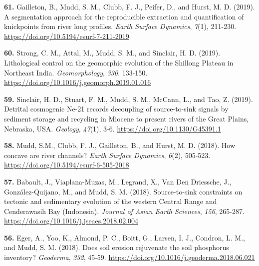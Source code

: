 \documentclass[10pt, a4paper]{article}
\newcommand{\years}[1]{\marginnote{\scriptsize #1}}
\begin{document}
\raggedright
 

\years{2019}\hangindent=0.7cm\textbf{61. }Gailleton, B., Mudd, S. M., Clubb, F. J., Peifer, D., and Hurst, M. D. (2019). A segmentation approach for the reproducible extraction and quantification of knickpoints from river long profiles. \textit{Earth Surface Dynamics}, \textit{7}(1), 211-230. \href{https://doi.org/10.5194/esurf-7-211-2019}{https://doi.org/10.5194/esurf-7-211-2019}\par
\years{2019}\hangindent=0.7cm\textbf{60. }Strong, C. M., Attal, M., Mudd, S. M., and Sinclair, H. D. (2019). Lithological control on the geomorphic evolution of the Shillong Plateau in Northeast India. \textit{Geomorphology}, \textit{330}, 133-150. \href{https://doi.org/10.1016/j.geomorph.2019.01.016}{https://doi.org/10.1016/j.geomorph.2019.01.016}\par
\years{2019}\hangindent=0.7cm\textbf{59. }Sinclair, H. D., Stuart, F. M., Mudd, S. M., McCann, L., and Tao, Z. (2019). Detrital cosmogenic Ne-21 records decoupling of source-to-sink signals by sediment storage and recycling in Miocene to present rivers of the Great Plains, Nebraska, USA. \textit{Geology}, \textit{47}(1), 3-6. \href{https://doi.org/10.1130/G45391.1}{https://doi.org/10.1130/G45391.1}\par
\years{2018}\hangindent=0.7cm\textbf{58. }Mudd, S.M., Clubb, F. J., Gailleton, B., and Hurst, M. D. (2018). How concave are river channels? \textit{Earth Surface Dynamics}, \textit{6}(2), 505-523. \href{https://doi.org/10.5194/esurf-6-505-2018}{https://doi.org/10.5194/esurf-6-505-2018}\par
\years{2018}\hangindent=0.7cm\textbf{57. }Babault, J., Viaplana-Muzas, M., Legrand, X., Van Den Driessche, J., González-Quijano, M., and Mudd, S. M. (2018). Source-to-sink constraints on tectonic and sedimentary evolution of the western Central Range and Cenderawasih Bay (Indonesia). \textit{Journal of Asian Earth Sciences}, \textit{156}, 265-287. \href{https://doi.org/10.1016/j.jseaes.2018.02.004}{https://doi.org/10.1016/j.jseaes.2018.02.004}\par
\years{2018}\hangindent=0.7cm\textbf{56. }Eger, A., Yoo, K., Almond, P. C., Boitt, G., Larsen, I. J., Condron, L. M., and Mudd, S. M. (2018). Does soil erosion rejuvenate the soil phosphorus inventory? \textit{Geoderma}, \textit{332}, 45-59. \href{https://doi.org/10.1016/j.geoderma.2018.06.021}{https://doi.org/10.1016/j.geoderma.2018.06.021}\par
\end{document}
